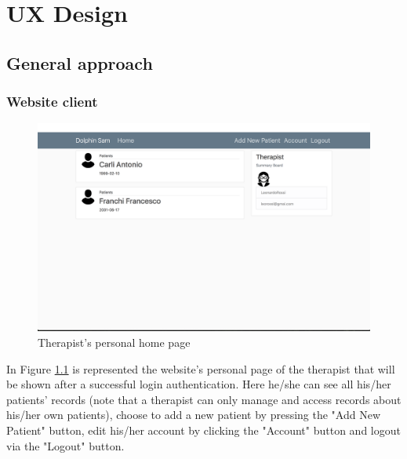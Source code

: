 \chapter{UX Design}
\section{General approach}
\subsection{Website client}
\begin{figure}[h!]
	\includegraphics[width=\textwidth]{images/UX/website/4-patientsList}
	\caption{Therapist's personal home page}
	\label{fig:webPatList}
\end{figure}
In Figure \ref{fig:webPatList} is represented the website's personal page of the therapist that will be shown after a successful login authentication. Here he/she can see all his/her patients' records (note that a therapist can only manage and access records about his/her own patients), choose to add a new patient by pressing the "Add New Patient" button, edit his/her account by clicking the "Account" button and logout via the "Logout" button.

